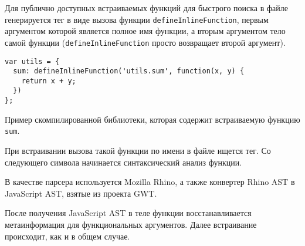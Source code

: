 Для публично доступных встраиваемых функций для быстрого поиска
в файле генерируется тег в виде вызова функции
\texttt{defineInlineFunction}, первым аргументом которой
является полное имя функции, а вторым аргументом
тело самой функции (\texttt{defineInlineFunction}
просто возвращает второй аргумент).

\begin{listing}[H]
\begin{verbatim}
var utils = {
  sum: defineInlineFunction('utils.sum', function(x, y) {
    return x + y;
  })
};
\end{verbatim}
\caption{Пример скомпилированной библиотеки, которая содержит
встраиваемую функцию \texttt{sum}.}
\end{listing}

При встраивании вызова такой функции по имени в файле
ищется тег. Со следующего символа начинается
синтаксический анализ функции.

В качестве парсера используется Mozilla Rhino,
а также конвертер Rhino AST в JavaScript AST,
взятые из проекта GWT.

После получения JavaScript AST в теле
функции восстанавливается
метаинформация для функциональных аргументов. Далее встраивание
происходит, как и в общем случае.
